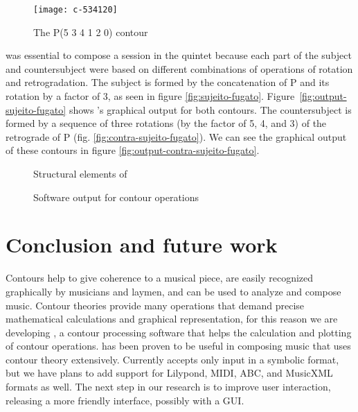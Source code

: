 \begin{figure}
  \centering
  \texttt{[image: c-534120]}
  \caption{The P(5 3 4 1 2 0) contour}
  \label{fig:c-534120}
\end{figure}

\goiaba{} was essential to compose a  session in the
quintet because each part of the subject and countersubject were based
on different combinations of operations of rotation and
retrogradation. The subject is formed by the concatenation of P and
its rotation by a factor of 3, as seen in figure
\ref{fig:sujeito-fugato}. Figure~\ref{fig:output-sujeito-fugato} shows
\goiaba{}'s graphical output for both contours. The countersubject is
formed by a sequence of three rotations (by the factor of 5, 4, and 3)
of the retrograde of P (fig. \ref{fig:contra-sujeito-fugato}). We can
see the graphical output of these contours in figure
\ref{fig:output-contra-sujeito-fugato}.

\begin{figure*}
  \centering

  \caption{Structural elements of }
  \label{fig:elementos-fugato}
\end{figure*}

\begin{figure*}
  \centering
  \caption{Software output for  contour operations}
  \label{fig:output-fugato}
\end{figure*}

\section{Conclusion and future work}
\label{sec:conclusion-future-work}

Contours help to give coherence to a musical piece, are easily
recognized graphically by musicians and laymen, and can be used to
analyze and compose music. Contour theories provide many operations
that demand precise mathematical calculations and graphical
representation, for this reason we are developing \goiaba{}, a contour
processing software that helps the calculation and plotting of contour
operations. \goiaba{} has been proven to be useful in composing music
that uses contour theory extensively. Currently \goiaba{} accepts only
input in a symbolic format, but we have plans to add support for
Lilypond, MIDI, ABC, and MusicXML formats as well. The next step in
our research is to improve \goiaba{} user interaction, releasing a
more friendly interface, possibly with a GUI.


